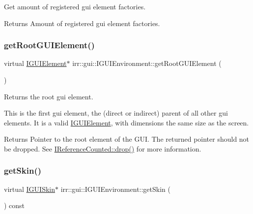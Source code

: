 Get amount of registered gui element factories. 

\begin{DoxyReturn}{Returns}
Amount of registered gui element factories. 
\end{DoxyReturn}
\mbox{\label{classirr_1_1gui_1_1IGUIEnvironment_a35fec6d5baa9b2f65aa9ee2c336104d4}} 
\subsubsection{\texorpdfstring{get\+Root\+G\+U\+I\+Element()}{getRootGUIElement()}}
{\footnotesize\ttfamily virtual \hyperlink{classirr_1_1gui_1_1IGUIElement}{I\+G\+U\+I\+Element}$\ast$ irr\+::gui\+::\+I\+G\+U\+I\+Environment\+::get\+Root\+G\+U\+I\+Element (\begin{DoxyParamCaption}{ }\end{DoxyParamCaption})\hspace{0.3cm}{\ttfamily [pure virtual]}}



Returns the root gui element. 

This is the first gui element, the (direct or indirect) parent of all other gui elements. It is a valid \hyperlink{classirr_1_1gui_1_1IGUIElement}{I\+G\+U\+I\+Element}, with dimensions the same size as the screen. \begin{DoxyReturn}{Returns}
Pointer to the root element of the G\+UI. The returned pointer should not be dropped. See \hyperlink{classirr_1_1IReferenceCounted_a03856a09355b89d178090c4a5f738543}{I\+Reference\+Counted\+::drop()} for more information. 
\end{DoxyReturn}
\mbox{\label{classirr_1_1gui_1_1IGUIEnvironment_a54ce9072ea7b89cdaea65306e93ba90c}} 
\subsubsection{\texorpdfstring{get\+Skin()}{getSkin()}}
{\footnotesize\ttfamily virtual \hyperlink{classirr_1_1gui_1_1IGUISkin}{I\+G\+U\+I\+Skin}$\ast$ irr\+::gui\+::\+I\+G\+U\+I\+Environment\+::get\+Skin (\begin{DoxyParamCaption}{ }\end{DoxyParamCaption}) const\hspace{0.3cm}{\ttfamily [pure virtual]}}



